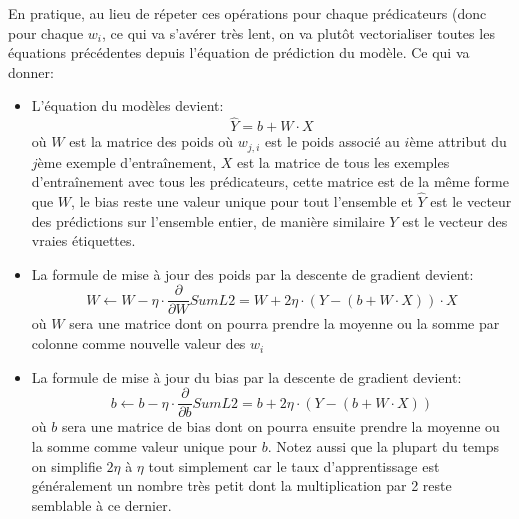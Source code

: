 En pratique, au lieu de répeter ces opérations pour chaque prédicateurs (donc pour chaque \(w_i\), ce qui va s'avérer très lent, on va plutôt vectorialiser toutes les équations précédentes depuis l'équation de prédiction du modèle. Ce qui va donner:

\begin{itemize}
    \item L'équation du modèles devient: \[\hat{Y} = b + W \cdot X\] où $W$ est la matrice des poids où \(w_{j,i}\) est le poids associé au $i$ème attribut du $j$ème exemple d'entraînement, \(X\) est la matrice de tous les exemples d'entraînement avec tous les prédicateurs, cette matrice est de la même forme que $W$, le bias reste une valeur unique pour tout l'ensemble et $\hat{Y}$ est le vecteur des prédictions sur l'ensemble entier, de manière similaire \(Y\) est le vecteur des vraies étiquettes.
    \item La formule de mise à jour des poids par la descente de gradient devient: \[W \leftarrow W - \eta \cdot \frac{\partial}{\partial W} SumL2 = W + 2\eta \cdot (Y - (b + W \cdot X)) \cdot X\] où \(W\) sera une matrice dont on pourra prendre la moyenne ou la somme par colonne comme nouvelle valeur des \(w_i\)
    \item La formule de mise à jour du bias par la descente de gradient devient: \[b \leftarrow b - \eta \cdot \frac{\partial}{\partial b} SumL2 = b + 2\eta \cdot (Y - (b + W \cdot X))\] où $b$ sera une matrice de bias dont on pourra ensuite prendre la moyenne ou la somme comme valeur unique pour $b$. Notez aussi que la plupart du temps on simplifie \(2\eta\) à \(\eta\) tout simplement car le taux d'apprentissage est généralement un nombre très petit dont la multiplication par 2 reste semblable à ce dernier.
\end{itemize}

